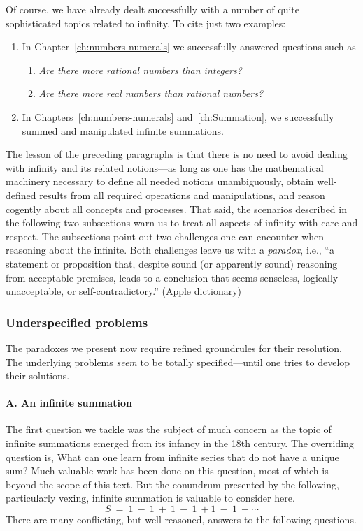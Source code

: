 Of course, we have already dealt successfully with a number of quite
sophisticated topics related to infinity.  To cite just two examples:
\begin{enumerate}
\item
In Chapter~\ref{ch:numbers-numerals} we successfully answered questions
such as
  \begin{enumerate}
  \item
{\it Are there more rational numbers than integers?}
  \item
{\it Are there more real numbers than rational numbers?}
  \end{enumerate}

\item
In Chapters~\ref{ch:numbers-numerals} and~\ref{ch:Summation}, we
successfully summed and manipulated infinite summations.
\end{enumerate}

The lesson of the preceding paragraphs is that there is no need to
avoid dealing with infinity and its related notions---as long as one
has the mathematical machinery necessary to define all needed notions
unambiguously, obtain well-defined results from all required
operations and manipulations, and reason cogently about all concepts
and processes.  That said, the scenarios described in the following
two subsections warn us to treat all aspects of infinity with care and
respect.  The subsections point out two challenges one can encounter
when reasoning about the infinite.  Both challenges leave us with a
{\em paradox}, i.e., ``a statement or proposition that, despite sound
(or apparently sound) reasoning from acceptable premises, leads to a
conclusion that seems senseless, logically unacceptable, or
self-contradictory.''  {\small (Apple dictionary)}


\subsubsection{Underspecified problems}
\label{sec:underspecified}

The paradoxes we present now require refined groundrules for their
resolution.  The underlying problems {\em seem} to be totally
specified---until one tries to develop their solutions.

\paragraph{\small\sf A. An infinite summation}

The first question we tackle was the subject of much concern as the
topic of infinite summations emerged from its infancy in the 18th
century.  The overriding question is, What can one learn from infinite
series that do not have a unique sum?  Much valuable work has been done on
this question, most of which is beyond the scope of this text.  But the
conundrum presented by the following, particularly vexing, infinite
summation is valuable to consider here.
\[ S \ = \ 1 \ - \ 1 \ + \ 1 \ - \ 1 \ + 1 \ - \ 1 \ + \cdots \]
There are many conflicting, but well-reasoned, answers to the following
questions.

